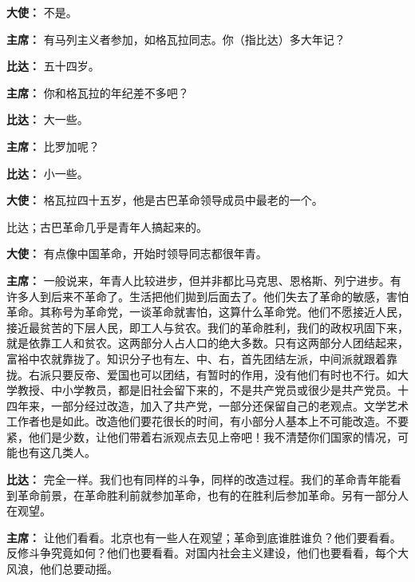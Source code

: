 \begin{duihua}
\item[\textbf{大使：}] 不是。

\item[\textbf{主席：}] 有马列主义者参加，如格瓦拉同志。你（指比达）多大年记？

\item[\textbf{比达：}] 五十四岁。

\item[\textbf{主席：}] 你和格瓦拉的年纪差不多吧？

\item[\textbf{比达：}] 大一些。

\item[\textbf{主席：}] 比罗加呢？

\item[\textbf{比达：}] 小一些。

\item[\textbf{大使：}] 格瓦拉四十五岁，他是古巴革命领导成员中最老的一个。

比达；古巴革命几乎是青年人搞起来的。

\item[\textbf{大使：}] 有点像中国革命，开始时领导同志都很年青。

\item[\textbf{主席：}] 一般说来，年青人比较进步，但并非都比马克思、恩格斯、列宁进步。有许多人到后来不革命了。生活把他们拋到后面去了。他们失去了革命的敏感，害怕革命。其称号为革命党，一谈革命就害怕，这算什么革命党。他们不愿接近人民，接近最贫苦的下层人民，即工人与贫农。我们的革命胜利，我们的政权巩固下来，就是依靠工人和贫农。这两部分人占人口的绝大多数。只有这两部分人团结起来，富裕中农就靠拢了。知识分子也有左、中、右，首先团结左派，中间派就跟着靠拢。右派只要反帝、爱国也可以团结，有暂时的作用，没有他们有时也不行。如大学教授、中小学教员，都是旧社会留下来的，不是共产党员或很少是共产党员。十四年来，一部分经过改造，加入了共产党，一部分还保留自己的老观点。文学艺术工作者也是如此。改造他们要花很长的时间，有小部分人基本上不可能改造。不要紧，他们是少数，让他们带着右派观点去见上帝吧！我不清楚你们国家的情况，可能也有这几类人。

\item[\textbf{比达：}] 完全一样。我们也有同样的斗争，同样的改造过程。我们的革命青年能看到革命前景，在革命胜利前就参加革命，也有的在胜利后参加革命。另有一部分人在观望。

\item[\textbf{主席：}] 让他们看看。北京也有一些人在观望；革命到底谁胜谁负？他们要看看。反修斗争究竟如何？他们也要看看。对国内社会主义建设，他们也要看看，每个大风浪，他们总要动摇。


\end{duihua}
